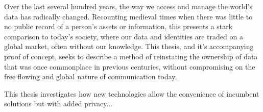 \abstract

\thispagestyle{plain}
\setcounter{page}{1}

Over the last several hundred years, the way we access and manage the world's data has radically changed. Recounting medieval times when there was little to no public record of a person's assets or information, this presents a stark comparison to today's society, where our data and identities are traded on a global market, often without our knowledge. This thesis, and it's accompanying proof of concept, seeks to describe a method of reinstating the ownership of data that was once commonplace in previous centuries, without compromising on the free flowing and global nature of communication today.

This thesis investigates how new technologies allow the convenience of incumbent solutions but with added privacy...




